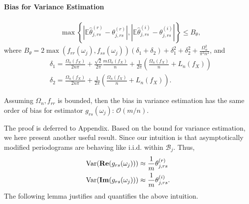 \paragraph{Bias for Variance Estimation}
\begin{lem}
\label{lemma:theta_bias}
\begin{equation}
\begin{aligned}
&\max\left\{\left|\mathbb{E} \hat{\theta}^{(r)}_{j,rs} - \theta^{(r)}_{j, rs}\right|,  \left|\mathbb{E} \hat{\theta}^{(i)}_{j,rs} - \theta^{(i)}_{j, rs}\right|\right\}\le B_\theta,
\end{aligned}
\end{equation}
where $B_\theta = 2\max (f_{rr}(\omega_j),f_{ss}(\omega_j))(\delta_1+\delta_2)+\delta_1^2+\delta_2^2+\frac{\Omega_n^2}{\pi^2n^2}$,
and 
\begin{equation}
\label{eq:def_delta12}
\begin{aligned}
&\delta_1 = \frac{\Omega_n(f_X)}{2n\pi}+\frac{\sqrt{2}}{2\pi}\frac{m\Omega_n(f_X)}{n}+ \frac{1}{2\pi}\left(\frac{\Omega_n(f_X)}{n} + L_n(f_X)\right) \\
&\delta_2=\frac{\Omega_n(f_X)}{2n\pi}+ \frac{1}{2\pi}\left(\frac{\Omega_n(f_X)}{n} + L_n(f_X)\right).
\end{aligned}
\end{equation}
\end{lem}
\begin{remark}
Assuming $\Omega_n,  f_{rr}$ is bounded, then the bias in variance estimation has the same order of bias for estimator $g_{rs}(\omega_j)$: $\mathcal{O}(m/n)$. 
\end{remark}
The proof is deferred to Appendix. 
Based on the bound for variance estimation, we here present another useful result. Since our intuition is that asymptotically modified periodograms are behaving like i.i.d. within $\mathcal{B}_j$. Thus,  
\begin{equation}
\begin{aligned}
& \mathrm{Var}({\bf Re}(g_{rs}(\omega_j))) \approx \frac{1}{m} \theta^{(r)}_{j, rs}\\ 
& \mathrm{Var}({\bf Im}(g_{rs}(\omega_j))) \approx \frac{1}{m} \theta^{(i)}_{j, rs}.
\end{aligned}
\end{equation}
The following lemma justifies and quantifies the above intuition. 

